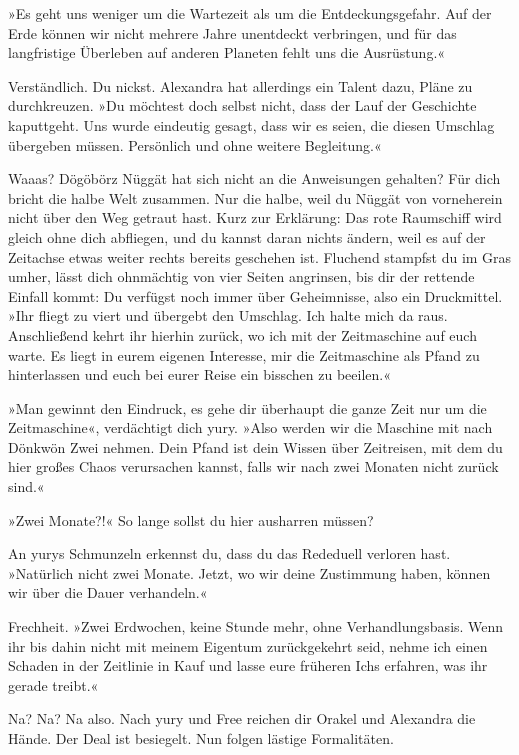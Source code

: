 »Es geht uns weniger um die Wartezeit als um die Entdeckungsgefahr. Auf der Erde können wir nicht mehrere Jahre unentdeckt verbringen, und für das langfristige Überleben auf anderen Planeten fehlt uns die Ausrüstung.«

Verständlich. Du nickst. Alexandra hat allerdings ein Talent dazu, Pläne zu durchkreuzen. »Du möchtest doch selbst nicht, dass der Lauf der Geschichte kaputtgeht. Uns wurde eindeutig gesagt, dass wir es seien, die diesen Umschlag übergeben müssen. Persönlich und ohne weitere Begleitung.«

Waaas? Dögöbörz Nüggät hat sich nicht an die Anweisungen gehalten? Für dich bricht die halbe Welt zusammen. Nur die halbe, weil du Nüggät von vorneherein nicht über den Weg getraut hast. Kurz zur Erklärung: Das rote Raumschiff wird gleich ohne dich abfliegen, und du kannst daran nichts ändern, weil es auf der Zeitachse etwas weiter rechts bereits geschehen ist. Fluchend stampfst du im Gras umher, lässt dich ohnmächtig von vier Seiten angrinsen, bis dir der rettende Einfall kommt: Du verfügst noch immer über Geheimnisse, also ein Druckmittel. »Ihr fliegt zu viert und übergebt den Umschlag. Ich halte mich da raus. Anschließend kehrt ihr hierhin zurück, wo ich mit der Zeitmaschine auf euch warte. Es liegt in eurem eigenen Interesse, mir die Zeitmaschine als Pfand zu hinterlassen und euch bei eurer Reise ein bisschen zu beeilen.«

»Man gewinnt den Eindruck, es gehe dir überhaupt die ganze Zeit nur um die Zeitmaschine«, verdächtigt dich yury. »Also werden wir die Maschine mit nach Dönkwön Zwei nehmen. Dein Pfand ist dein Wissen über Zeitreisen, mit dem du hier großes Chaos verursachen kannst, falls wir nach zwei Monaten nicht zurück sind.«

»Zwei Monate?!« So lange sollst du hier ausharren müssen?

An yurys Schmunzeln erkennst du, dass du das Rededuell verloren hast. »Natürlich nicht zwei Monate. Jetzt, wo wir deine Zustimmung haben, können wir über die Dauer verhandeln.«

Frechheit. »Zwei Erdwochen, keine Stunde mehr, ohne Verhandlungsbasis. Wenn ihr bis dahin nicht mit meinem Eigentum zurückgekehrt seid, nehme ich einen Schaden in der Zeitlinie in Kauf und lasse eure früheren Ichs erfahren, was ihr gerade treibt.«

Na? Na? Na also. Nach yury und Free reichen dir Orakel und Alexandra die Hände. Der Deal ist besiegelt. Nun folgen lästige Formalitäten.

